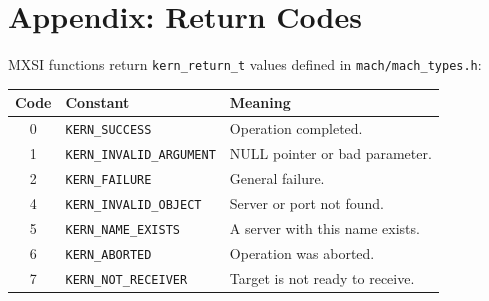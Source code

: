 \documentclass[a4paper,11pt]{article}
\begin{document}
\section{Appendix: Return Codes}

MXSI functions return \texttt{kern\_return\_t} values defined in
\texttt{mach/mach\_types.h}:

\begin{center}
\begin{tabularx}{\textwidth}{|c|l|X|}
\hline
\textbf{Code} & \textbf{Constant} & \textbf{Meaning} \\
\hline
0  & \texttt{KERN\_SUCCESS}           & Operation completed. \\
1  & \texttt{KERN\_INVALID\_ARGUMENT} & NULL pointer or bad parameter. \\
2  & \texttt{KERN\_FAILURE}           & General failure. \\
4  & \texttt{KERN\_INVALID\_OBJECT}   & Server or port not found. \\
5  & \texttt{KERN\_NAME\_EXISTS}      & A server with this name exists. \\
6  & \texttt{KERN\_ABORTED}           & Operation was aborted. \\
7  & \texttt{KERN\_NOT\_RECEIVER}     & Target is not ready to receive. \\
\hline
\end{tabularx}
\end{center}
\end{document}
